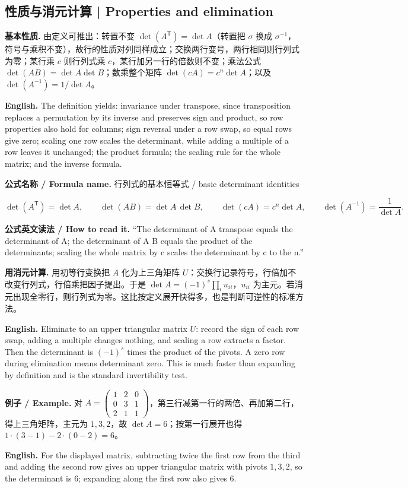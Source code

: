 \documentclass[UTF8,11pt,a4paper]{ctexart}
\newcommand{\EN}[1]{\par\noindent\textbf{English.} #1\par}
\newcommand{\READ}[1]{\par\noindent\textbf{公式英文读法 / How to read it.} #1\par}
\newcommand{\FORMULA}[2]{\par\noindent\textbf{公式名称 / Formula name.} #1 / #2\par}
\newcommand{\EX}[2]{\par\noindent\textbf{例子 / Example.} #1\par\EN{#2}}
\begin{document}
\subsection{性质与消元计算 | Properties and elimination}
\noindent\textbf{基本性质.} 由定义可推出：转置不变 $\det(A^{\mathsf T})=\det A$（转置把 $\sigma$ 换成 $\sigma^{-1}$，符号与乘积不变），故行的性质对列同样成立；交换两行变号，两行相同则行列式为零；某行乘 $c$ 则行列式乘 $c$，某行加另一行的倍数则不变；乘法公式 $\det(AB)=\det A\det B$；数乘整个矩阵 $\det(cA)=c^n\det A$；以及 $\det(A^{-1})=1/\det A$。
\EN{The definition yields: invariance under transpose, since transposition replaces a permutation by its inverse and preserves sign and product, so row properties also hold for columns; sign reversal under a row swap, so equal rows give zero; scaling one row scales the determinant, while adding a multiple of a row leaves it unchanged; the product formula; the scaling rule for the whole matrix; and the inverse formula.}
\FORMULA{行列式的基本恒等式}{basic determinant identities}
\[
\det(A^{\mathsf T})=\det A,\qquad \det(AB)=\det A\,\det B,\qquad \det(cA)=c^n\det A,\qquad \det(A^{-1})=\frac{1}{\det A}.
\]
\READ{``The determinant of A transpose equals the determinant of A; the determinant of A B equals the product of the determinants; scaling the whole matrix by c scales the determinant by c to the n.''}
\noindent\textbf{用消元计算.} 用初等行变换把 $A$ 化为上三角矩阵 $U$：交换行记录符号，行倍加不改变行列式，行倍乘把因子提出。于是 $\det A=(-1)^s\prod_i u_{ii}$，$u_{ii}$ 为主元。若消元出现全零行，则行列式为零。这比按定义展开快得多，也是判断可逆性的标准方法。
\EN{Eliminate to an upper triangular matrix $U$: record the sign of each row swap, adding a multiple changes nothing, and scaling a row extracts a factor. Then the determinant is $(-1)^s$ times the product of the pivots. A zero row during elimination means determinant zero. This is much faster than expanding by definition and is the standard invertibility test.}
\EX{对 $A=\begin{pmatrix}1&2&0\\0&3&1\\2&1&1\end{pmatrix}$，第三行减第一行的两倍、再加第二行，得上三角矩阵，主元为 $1,3,2$，故 $\det A=6$；按第一行展开也得 $1\cdot(3-1)-2\cdot(0-2)=6$。}{For the displayed matrix, subtracting twice the first row from the third and adding the second row gives an upper triangular matrix with pivots $1,3,2$, so the determinant is $6$; expanding along the first row also gives $6$.}
\end{document}
